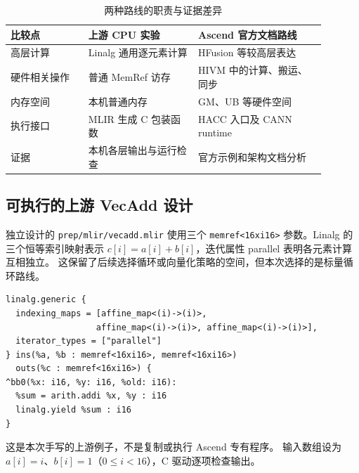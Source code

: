 \documentclass[UTF8,a4paper,11pt]{ctexart}
\begin{document}
\begin{table}[htbp]
\centering\small
\begin{tabular}{p{0.22\linewidth}p{0.31\linewidth}p{0.36\linewidth}}
\toprule
比较点 & 上游 CPU 实验 & Ascend 官方文档路线\\
\midrule
高层计算 & Linalg 通用逐元素计算 & HFusion 等较高层表达\\
硬件相关操作 & 普通 MemRef 访存 & HIVM 中的计算、搬运、同步\\
内存空间 & 本机普通内存 & GM、UB 等硬件空间\\
执行接口 & MLIR 生成 C 包装函数 & HACC 入口及 CANN runtime\\
证据 & 本机各层输出与运行检查 & 官方示例和架构文档分析\\
\bottomrule
\end{tabular}
\caption{两种路线的职责与证据差异}
\end{table}

\subsection{可执行的上游 VecAdd 设计}
独立设计的 \texttt{prep/mlir/vecadd.mlir} 使用三个
\texttt{memref<16xi16>} 参数。Linalg 的三个恒等索引映射表示
$c[i]=a[i]+b[i]$，迭代属性 parallel 表明各元素计算互相独立。
这保留了后续选择循环或向量化策略的空间，但本次选择的是标量循环路线。
\par\vspace{0.7\baselineskip}\noindent\begin{minipage}[t]{\linewidth}
\begin{lstlisting}
linalg.generic {
  indexing_maps = [affine_map<(i)->(i)>,
                  affine_map<(i)->(i)>, affine_map<(i)->(i)>],
  iterator_types = ["parallel"]
} ins(%a, %b : memref<16xi16>, memref<16xi16>)
  outs(%c : memref<16xi16>) {
^bb0(%x: i16, %y: i16, %old: i16):
  %sum = arith.addi %x, %y : i16
  linalg.yield %sum : i16
}
\end{lstlisting}
\end{minipage}\par\vspace{0.5\baselineskip}
这是本次手写的上游例子，不是复制或执行 Ascend 专有程序。
输入数组设为 $a[i]=i$、$b[i]=1$（$0\leq i<16$），C 驱动逐项检查输出。
\end{document}
